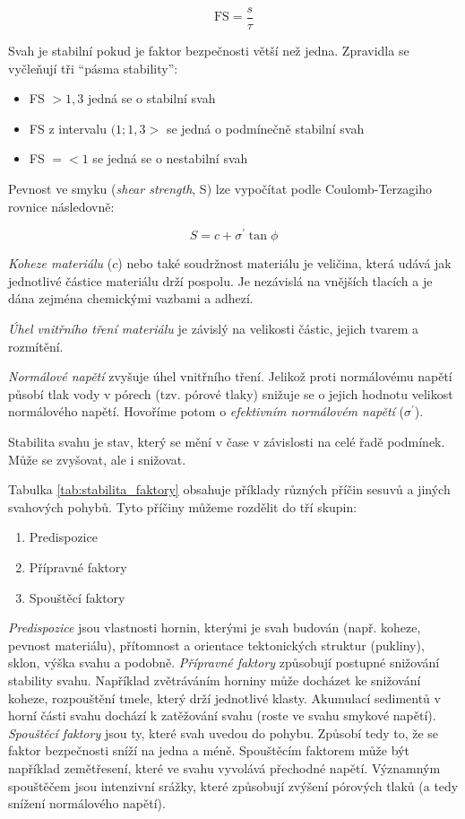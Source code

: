 \begin{equation}
	\text{FS} = \frac{s}{\tau}	
\end{equation}

Svah je stabilní pokud je faktor bezpečnosti větší než jedna. Zpravidla se vyčleňují tři \enquote{pásma stability}:

\begin{itemize}
	\item FS $>1,3$ jedná se o stabilní svah
	\item FS z intervalu $(1;1,3>$ se jedná o podmínečně stabilní svah
	\item FS $=<1$ se jedná se o nestabilní svah
\end{itemize}

Pevnost ve smyku (\textit{shear strength}, S) lze vypočítat podle Coulomb-Terzagiho rovnice následovně:

\begin{equation}
	S = c+\sigma^{\prime}\tan{\phi}
\end{equation}

\emph{Koheze materiálu} ($c$) nebo také soudržnost materiálu je veličina, která udává jak jednotlivé částice materiálu drží pospolu. Je nezávislá na vnějších tlacích a je dána zejména chemickými vazbami a adhezí.

\emph{Úhel vnitřního tření materiálu} je závislý na velikosti částic, jejich tvarem a rozmítění.

\emph{Normálové napětí} zvyšuje úhel vnitřního tření. Jelikož proti normálovému napětí působí tlak vody v pórech (tzv. pórové tlaky) snižuje se o jejich hodnotu velikost normálového napětí. Hovoříme potom o \emph{efektivním normálovém napětí} ($\sigma^{\prime}$).

Stabilita svahu je stav, který se mění v čase v závislosti na celé řadě podmínek. Může se zvyšovat, ale i snižovat. 

Tabulka \ref{tab:stabilita_faktory} obsahuje příklady různých příčin sesuvů a jiných svahových pohybů. Tyto příčiny můžeme rozdělit do tří skupin:
\begin{enumerate}
	\item Predispozice
	\item Přípravné faktory
	\item Spouštěcí faktory
\end{enumerate}

\emph{Predispozice} jsou vlastnosti hornin, kterými je svah budován (např. koheze, pevnost materiálu), přítomnost a orientace tektonických struktur (pukliny), sklon, výška svahu a podobně. \emph{Přípravné faktory} způsobují postupné snižování stability svahu. Například zvětráváním horniny může docházet ke snižování koheze, rozpouštění tmele, který drží jednotlivé klasty. Akumulací sedimentů v horní části svahu dochází k zatěžování svahu (roste ve svahu smykové napětí). \emph{Spouštěcí faktory} jsou ty, které svah uvedou do pohybu. Způsobí tedy to, že se faktor bezpečnosti sníží na jedna a méně. Spouštěcím faktorem může být například zemětřesení, které ve svahu vyvolává přechodné napětí. Významným spouštěčem jsou intenzivní srážky, které způsobují zvýšení pórových tlaků (a tedy snížení normálového napětí).

